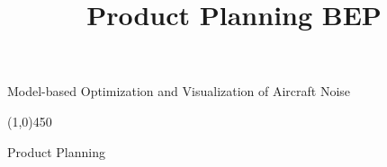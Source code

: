 \documentclass[a4paper,english,fleqn]{exam}
\title{Product Planning BEP}
\newcommand{\cMysename}{Model-based Optimization and Visualization of Aircraft Noise}
\newcommand{\doctitle}{Product Planning }
\begin{document}
\thispagestyle{empty}

\begin{center}

\vspace*{2cm}
{\huge \cMysename}

\begin{center}
    \line(1,0){450}
\end{center}

{\LARGE \doctitle}

\vspace{1cm}

\end{center}
\newpage

\tableofcontents
\newpage





\end{document}

